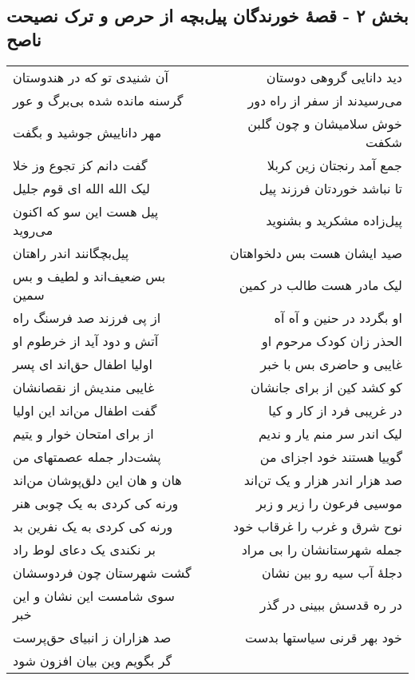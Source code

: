 \begin{center}
\section*{بخش ۲ - قصهٔ خورندگان پیل‌بچه از حرص و  ترک نصیحت ناصح}
\label{sec:sh002}
\begin{longtable}{l p{0.5cm} r}
آن شنیدی تو که در هندوستان
&&
دید دانایی گروهی دوستان
\\
گرسنه مانده شده بی‌برگ و عور
&&
می‌رسیدند از سفر از راه دور
\\
مهر داناییش جوشید و بگفت
&&
خوش سلامیشان و چون گلبن شکفت
\\
گفت دانم کز تجوع وز خلا
&&
جمع آمد رنجتان زین کربلا
\\
لیک الله الله ای قوم جلیل
&&
تا نباشد خوردتان فرزند پیل
\\
پیل هست این سو که اکنون می‌روید
&&
پیل‌زاده مشکرید و بشنوید
\\
پیل‌بچگانند اندر راهتان
&&
صید ایشان هست بس دلخواهتان
\\
بس ضعیف‌اند و لطیف و بس سمین
&&
لیک مادر هست طالب در کمین
\\
از پی فرزند صد فرسنگ راه
&&
او بگردد در حنین و آه آه
\\
آتش و دود آید از خرطوم او
&&
الحذر زان کودک مرحوم او
\\
اولیا اطفال حق‌اند ای پسر
&&
غایبی و حاضری بس با خبر
\\
غایبی مندیش از نقصانشان
&&
کو کشد کین از برای جانشان
\\
گفت اطفال من‌اند این اولیا
&&
در غریبی فرد از کار و کیا
\\
از برای امتحان خوار و یتیم
&&
لیک اندر سر منم یار و ندیم
\\
پشت‌دار جمله عصمتهای من
&&
گوییا هستند خود اجزای من
\\
هان و هان این دلق‌پوشان من‌اند
&&
صد هزار اندر هزار و یک تن‌اند
\\
ورنه کی کردی به یک چوبی هنر
&&
موسیی فرعون را زیر و زبر
\\
ورنه کی کردی به یک نفرین بد
&&
نوح شرق و غرب را غرقاب خود
\\
بر نکندی یک دعای لوط راد
&&
جمله شهرستانشان را بی مراد
\\
گشت شهرستان چون فردوسشان
&&
دجلهٔ آب سیه رو بین نشان
\\
سوی شامست این نشان و این خبر
&&
در ره قدسش ببینی در گذر
\\
صد هزاران ز انبیای حق‌پرست
&&
خود بهر قرنی سیاستها بدست
\\
گر بگویم وین بیان افزون شود

\end{longtable}
\end{center}
